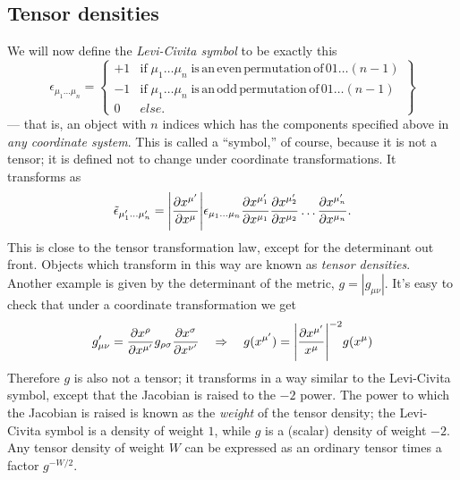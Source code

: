 \subsection{Tensor densities}
We will now define the \emph{Levi-Civita symbol} to be exactly this
\begin{equation}
	\epsilon_{\mu_1 \dots \mu_n} = \left\{ \begin{array}{lr}
	+1 & \mathrm{if} \;\mu_1 \dots\mu_n \;\mathrm{is\,an\, even\, permutation\, of\,} 01 \dots (n-1) \\
	-1 &\mathrm{if} \;\mu_1 \dots\mu_n \;\mathrm{is\,an\, odd\, permutation\, of\,} 01 \dots (n-1) \\
	0& else.
	\end{array}   \right\}
\end{equation}
— that is, an object
with $n$ indices which has the components specified above in \emph{any coordinate system}. This is
called a “symbol,” of course, because it is not a tensor; it is defined not to change under
coordinate transformations. It transforms as
\begin{equation}
	\tilde{\epsilon}_{\mu^\prime_1 \dots \mu^\prime_n} = \abs{\frac{\partial x^{\mu^\prime}}{\partial x^{\mu}}} \epsilon_{\mu_1 \dots \mu_n} \frac{\partial x^{\mu^\prime_1}}{\partial x^{\mu_1}} \frac{\partial x^{\mu^\prime_2}}{\partial x^{\mu_2}} \dots \frac{\partial x^{\mu^\prime_n}}{\partial x^{\mu_n}}.
\end{equation}
This is close to the tensor transformation law, except for the determinant out front. Objects
which transform in this way are known as \emph{tensor densities}.\\
Another example is given by
the determinant of the metric, $g = |g_{\mu \nu} |$. It’s easy to check that under a coordinate transformation we get
\begin{equation}
g^\prime_{\mu \nu} = \frac{\partial x^\rho}{\partial x^{\mu^\prime}}g_{\rho \sigma} \frac{\partial x^\sigma}{\partial x^{\nu^\prime}}\quad \Rightarrow\quad   g(x^{\mu^\prime}) = \abs{\frac{\partial x^{\mu^\prime}}{x^{\mu}}}^{-2} g(x^{\mu})
\end{equation}
Therefore $g$ is also not a tensor; it transforms in a way similar to the Levi-Civita symbol,
except that the Jacobian is raised to the $−2$ power. The power to which the Jacobian is
raised is known as the \emph{weight} of the tensor density; the Levi-Civita symbol is a density of
weight $1$, while $g$ is a (scalar) density of weight $−2$.\\
Any tensor density of weight $W$ can be expressed as an ordinary tensor times a factor $g^{-W/2}$.
